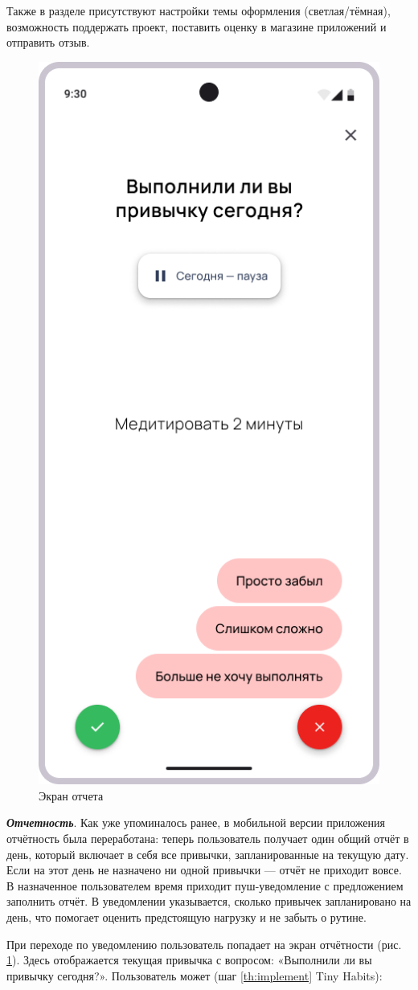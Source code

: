 \documentclass[pdflatex,sn-mathphys-num]{sn-jnl}%
\theoremstyle{thmstyleone}%
\theoremstyle{thmstyletwo}%
\theoremstyle{thmstylethree}%
\begin{document}
Также в разделе присутствуют настройки темы оформления (светлая/тёмная), возможность поддержать проект, поставить оценку в магазине приложений и отправить отзыв.

\medskip

\begin{figure}
    \centering
    \includegraphics[width=0.5\linewidth]{figures/App/Report_1.png}
    \caption{Экран отчета}
    \label{fig:Report_1}
\end{figure}

\textbf{\textit{Отчетность}}. Как уже упоминалось ранее, в мобильной версии приложения отчётность была переработана: теперь пользователь получает один общий отчёт в день, который включает в себя все привычки, запланированные на текущую дату. Если на этот день не назначено ни одной привычки — отчёт не приходит вовсе. В назначенное пользователем время приходит пуш-уведомление с предложением заполнить отчёт. В уведомлении указывается, сколько привычек запланировано на день, что помогает оценить предстоящую нагрузку и не забыть о рутине.

При переходе по уведомлению пользователь попадает на экран отчётности (рис. \ref{fig:Report_1}). Здесь отображается текущая привычка с вопросом: «Выполнили ли вы привычку сегодня?». Пользователь может (шаг \ref{th:implement} Tiny Habits):
\end{document}
